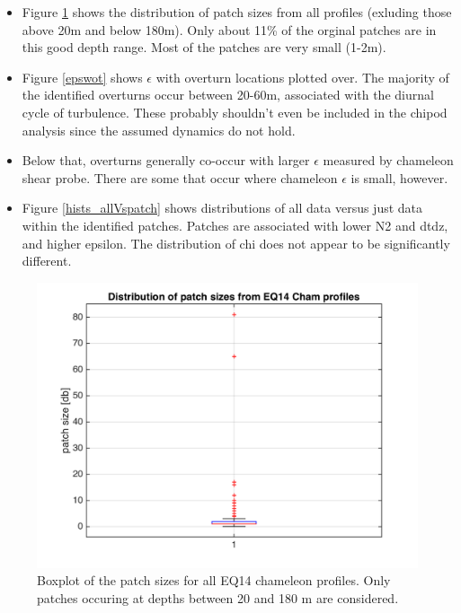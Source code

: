 \documentclass[11pt]{article}
\begin{document}
\begin{itemize}
\item Figure \ref{psizebox} shows the distribution of patch sizes from all profiles (exluding those above 20m and below 180m). Only about 11\% of the orginal patches are in this good depth range. Most of the patches are very small (1-2m).
\item Figure \ref{epswot} shows $\epsilon$ with overturn locations plotted over. The majority of the identified overturns occur between 20-60m, associated with the diurnal cycle of turbulence. These probably shouldn't even be included in the chipod analysis since the assumed dynamics do not hold.
\item Below that, overturns generally co-occur with larger $\epsilon$ measured by chameleon shear probe. There are some that occur where chameleon $\epsilon$ is small, however.
\item Figure \ref{hists_allVspatch} shows distributions of all data versus just data within the identified patches. Patches are associated with lower N2 and dtdz, and higher epsilon. The distribution of chi does not appear to be significantly different.
\end{itemize}


\begin{figure}[htbp]
\includegraphics[scale=0.8]{GamByPatch_patchsize_boxplot.png}
\caption{Boxplot of the patch sizes for all EQ14 chameleon profiles. Only patches occuring at depths between 20 and 180 m are considered.}
\label{psizebox}
\end{figure}
\end{document}
